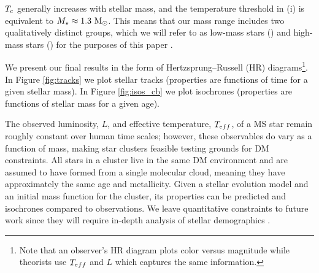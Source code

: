 \documentclass[useAMS,usenatbib]{mnras}
\begin{document}
  $T_c$ generally increases with stellar mass, and the temperature threshold in (i) is equivalent to $M_{\star} \approx 1.3 \ \mathrm{M}_{\odot}$. This means that our mass range includes two qualitatively distinct groups, which we will refer to as low-mass stars (\mrangelow) and high-mass stars (\mrangehigh) for the purposes of this paper .

  We present our final results in the form of Hertzsprung–Russell (HR) diagrams\footnote{Note that an observer's HR diagram plots color versus magnitude while theorists use $T_{eff}$ and $L$ which captures the same information. }. In Figure \ref{fig:tracks} we plot stellar tracks (properties are functions of time for a given stellar mass). In Figure \ref{fig:isos_cb} we plot isochrones (properties are functions of stellar mass for a given age).

  The observed luminosity, $L$, and effective temperature, $T_{eff}$, of a MS star remain roughly constant over human time scales; however, these observables do vary as a function of mass, making star clusters feasible testing grounds for DM constraints. All stars in a cluster live in the same DM environment and are assumed to have formed from a single molecular cloud, meaning they have approximately the same age and metallicity. Given a stellar evolution model and an initial mass function for the cluster, its properties can be predicted and isochrones compared to observations. We leave quantitative constraints to future work since they will require in-depth analysis of stellar demographics .
\end{document}
